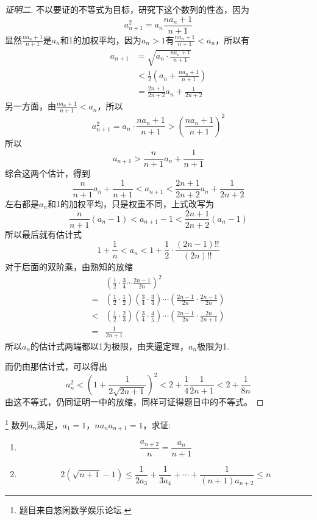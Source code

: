 \begin{proof}[证明二]
 不以要证的不等式为目标，研究下这个数列的性态，因为
\[ a_{n+1}^2=a_n \frac{na_n+1}{n+1} \]
显然$\frac{na_n+1}{n+1}$是$a_n$和1的加权平均，因为$a_n>1$有$\frac{na_n+1}{n+1}<a_n$，所以有
\begin{align*}
a_{n+1} &=\sqrt{a_n\cdot \frac{na_n+1}{n+1}} \\
& <\frac{1}{2} \left( a_n+\frac{na_n+1}{n+1} \right)  \\
& = \frac{2n+1}{2n+2}a_n+\frac{1}{2n+2}
\end{align*}
另一方面，由$\frac{na_n+1}{n+1}<a_n$，所以
\[ a_{n+1}^2=a_n \cdot  \frac{na_n+1}{n+1} > \left( \frac{na_n+1}{n+1} \right)^2 \]
所以
\[ a_{n+1}>\frac{n}{n+1}a_n+\frac{1}{n+1} \]
综合这两个估计，得到
\[ \frac{n}{n+1}a_n+\frac{1}{n+1} < a_{n+1} < \frac{2n+1}{2n+2}a_n+\frac{1}{2n+2} \]
左右都是$a_n$和1的加权平均，只是权重不同，上式改写为
\[ \frac{n}{n+1}(a_n-1) < a_{n+1}-1 < \frac{2n+1}{2n+2} (a_n-1) \]
所以最后就有估计式
\[ 1+\frac{1}{n} < a_n < 1 + \frac{1}{2} \cdot \frac{(2n-1)!!}{(2n)!!} \]
对于后面的双阶乘，由熟知的放缩
\begin{align*}
& \left( \frac{1}{2} \cdot \frac{3}{4} \cdots \frac{2n-1}{2n} \right)^2 \\
={} & \left( \frac{1}{2} \cdot \frac{1}{2} \right) \left(\frac{3}{4} \cdot \frac{3}{4} \right) \cdots \left( \frac{2n-1}{2n} \cdot \frac{2n-1}{2n} \right) \\
<{} & \left( \frac{1}{2} \cdot \frac{2}{3} \right) \left( \frac{3}{4} \cdot \frac{4}{5} \right) \cdots \left( \frac{2n-1}{2n} \cdot \frac{2n}{2n+1} \right) \\
={} & \frac{1}{2n+1}
\end{align*}
所以$a_n$的估计式两端都以1为极限，由夹逼定理，$a_n$极限为1.

而仍由那估计式，可以得出
\[ a_n^2< \left( 1+\frac{1}{2\sqrt{2n+1}} \right)^2 <2+\frac{1}{4} \frac{1}{2n+1} < 2+\frac{1}{8n} \]
由这不等式，仍同证明一中的放缩，同样可证得题目中的不等式。 
\end{proof}

\begin{exercise}\footnote{题目来自悠闲数学娱乐论坛.}
  数列$a_n$满足，$a_1=1$，$na_na_{n+1}=1$，求证: 
  \begin{enumerate}
  \item
    \[ \frac{a_{n+2}}{n} = \frac{a_n}{n+1} \]
  \item
    \[ 2(\sqrt{n+1}-1) \leqslant \frac{1}{2a_3}+\frac{1}{3a_4}+\cdots+\frac{1}{(n+1)a_{n+2}} \leqslant n \]
  \end{enumerate}
\end{exercise}

